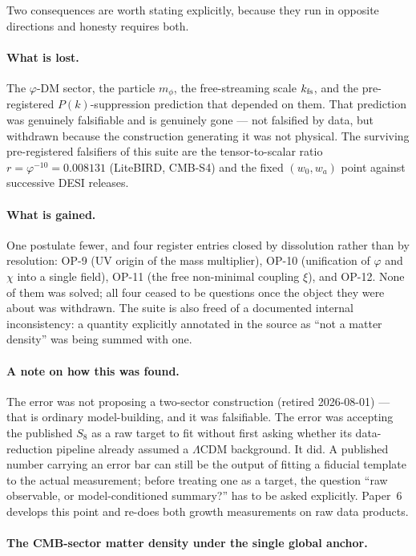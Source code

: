 \documentclass[12pt,a4paper]{article}
\begin{document}
Two consequences are worth stating explicitly, because they run in opposite
directions and honesty requires both.

\paragraph{What is lost.} The $\varphi$-DM sector, the particle
$m_\phi$, the free-streaming scale $k_{\rm fs}$, and the pre-registered
$P(k)$-suppression prediction that depended on them. That prediction was
genuinely falsifiable and is genuinely gone --- not falsified by data, but
withdrawn because the construction generating it was not physical. The
surviving pre-registered falsifiers of this suite are the tensor-to-scalar
ratio $r=\varphi^{-10}=0.008131$ (LiteBIRD, CMB-S4) and the fixed
$(w_0,w_a)$ point against successive DESI releases.

\paragraph{What is gained.} One postulate fewer, and four register entries
closed by dissolution rather than by resolution: OP-9 (UV origin of the mass
multiplier), OP-10 (unification of $\varphi$ and $\chi$ into a single field),
OP-11 (the free non-minimal coupling $\xi$), and OP-12. None of them was
solved; all four ceased to be questions once the object they were about was
withdrawn. The suite is also freed of a documented internal inconsistency:
a quantity explicitly annotated in the source as ``not a matter density'' was
being summed with one.

\paragraph{A note on how this was found.} The error was not proposing a
two-sector construction (retired 2026-08-01) --- that is ordinary
model-building, and it was
falsifiable. The error was accepting the published $S_8$ as a raw target to fit
without first asking whether its data-reduction pipeline already assumed a
$\Lambda$CDM background. It did. A published number carrying an error bar can
still be the output of fitting a fiducial template to the actual measurement;
before treating one as a target, the question ``raw observable, or
model-conditioned summary?'' has to be asked explicitly. Paper~6 develops this
point and re-does both growth measurements on raw data products.

\paragraph{The CMB-sector matter density under the single global anchor.}
\end{document}
